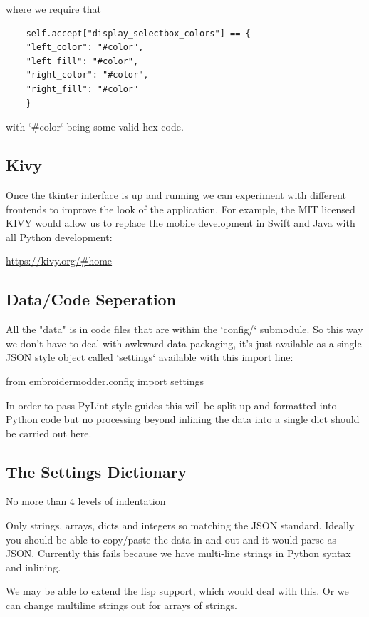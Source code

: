 \documentclass[10pt]{report}
\begin{document}
where we require that

\begin{lstlisting}
    self.accept["display_selectbox_colors"] == {
    "left_color": "#color",
    "left_fill": "#color",
    "right_color": "#color",
    "right_fill": "#color"
    }
\end{lstlisting}

with `\#color` being some valid hex code.

\subsection{Kivy}

Once the tkinter interface is up and running we can experiment
with different frontends to improve the look of the application.
For example, the MIT licensed KIVY would allow us to replace the 
mobile development in Swift and Java with all Python development:

\url{https://kivy.org/#home}

\subsection{Data/Code Seperation}

All the "data" is in code files that are within the `config/`
submodule. So this way we don't have to deal with awkward data
packaging, it's just available as a single JSON style object
called `settings` available with this import line:

    from embroidermodder.config import settings

In order to pass PyLint style guides this will be split up and
formatted into Python code but no processing beyond inlining
the data into a single dict should be carried out here.

\subsection{The Settings Dictionary}

No more than 4 levels of indentation

Only strings, arrays, dicts and integers so matching the JSON standard. Ideally you should be able to copy/paste the data in and out and it would parse as JSON. Currently this fails because we have multi-line strings in Python syntax and inlining.

We may be able to extend the lisp support, which would deal with this. Or we can change multiline strings out for arrays of strings.
\end{document}
